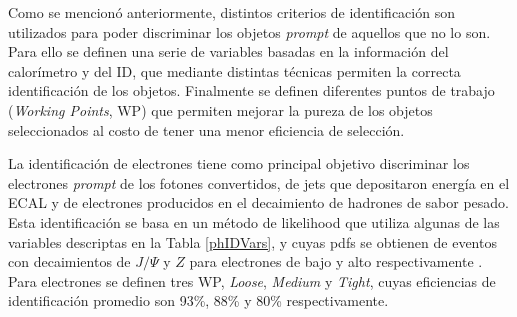 Como se mencionó anteriormente, distintos criterios de identificación son utilizados para poder discriminar los objetos \textit{prompt}  de aquellos que no lo son. Para ello se definen una serie de variables basadas en la información del calorímetro y del ID, que mediante distintas técnicas permiten la correcta identificación de los objetos. Finalmente se definen diferentes puntos de trabajo (\textit{Working Points}, WP) que permiten mejorar la pureza de los objetos seleccionados al costo de tener una menor eficiencia de selección.

La identificación de electrones tiene como principal objetivo discriminar los electrones \textit{prompt}  de los fotones convertidos, de jets que depositaron energía en el ECAL y de electrones producidos en el decaimiento de hadrones de sabor pesado. Esta identificación se basa en un método de likelihood que utiliza algunas de las variables descriptas en la Tabla \ref{phIDVars}, y cuyas pdfs se obtienen de eventos con decaimientos de $J/\Psi$ y $Z$ para electrones de bajo y alto \ET respectivamente \cite{PERF-2016-01}. Para electrones se definen tres WP, \textit{Loose}, \textit{Medium} y \textit{Tight}, cuyas eficiencias de identificación promedio son  93\%, 88\% y 80\% respectivamente.

